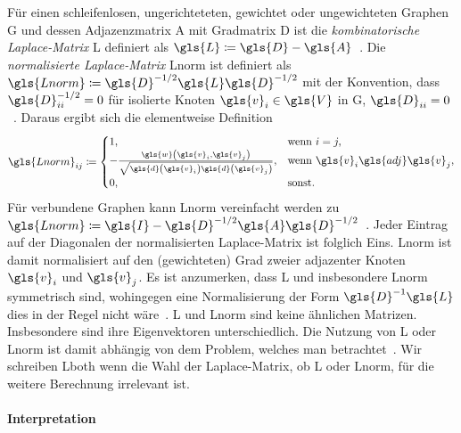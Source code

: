 Für einen schleifenlosen, ungerichteteten, gewichtet oder ungewichteten Graphen \gls{G} und dessen Adjazenzmatrix \gls{A} mit Gradmatrix \gls{D} ist die \emph{kombinatorische Laplace-Matrix} \gls{L} definiert als $\gls{L} \coloneqq \gls{D} - \gls{A}$~\cite{Chung}.
Die \emph{normalisierte Laplace-Matrix} \gls{Lnorm} ist definiert als $\gls{Lnorm} \coloneqq \gls{D}^{-1/2} \gls{L} \gls{D}^{-1/2}$ mit der Konvention, dass $\gls{D}^{-1/2}_{ii} = 0$ für isolierte Knoten $\gls{v}_i \in \gls{V}$ in \gls{G}, \dhe{} $\gls{D}_{ii} = 0$~\cite{Chung}.
Daraus ergibt sich die elementweise Definition
\begin{equation*}
  \gls{Lnorm}_{ij} \coloneqq \begin{cases}
  1, & \text{wenn }i = j,\\
    -\frac{\gls{w}\left(\gls{v}_i, \gls{v}_j\right)}{\sqrt{\gls{d}\left(\gls{v}_i\right)\gls{d}\left(\gls{v}_j\right)}}, & \text{wenn }\gls{v}_i \gls{adj} \gls{v}_j,\\
  0, & \text{sonst.}
\end{cases}
\end{equation*}
Für verbundene Graphen kann \gls{Lnorm} vereinfacht werden zu $\gls{Lnorm} \coloneqq \gls{I} - \gls{D}^{-1/2} \gls{A} \gls{D}^{-1/2}$~\cite{Chung}.
Jeder Eintrag auf der Diagonalen der normalisierten Laplace-Matrix ist folglich Eins.
\gls{Lnorm} ist damit normalisiert auf den (gewichteten) Grad zweier adjazenter Knoten $\gls{v}_i$ und $\gls{v}_j$.
Es ist anzumerken, dass \gls{L} und insbesondere \gls{Lnorm} symmetrisch sind, wohingegen eine Normalisierung der Form $\gls{D}^{-1}\gls{L}$ dies in der Regel nicht wäre~\cite{Reuter}.
\gls{L} und \gls{Lnorm} sind keine ähnlichen Matrizen.
Insbesondere sind ihre Eigenvektoren unterschiedlich.
Die Nutzung von \gls{L} oder \gls{Lnorm} ist damit abhängig von dem Problem, welches man betrachtet~\cite{Hammond}.
Wir schreiben \gls{Lboth} wenn die Wahl der Laplace-Matrix, ob \gls{L} oder \gls{Lnorm}, für die weitere Berechnung irrelevant ist.

\paragraph{Interpretation}
\label{laplace_interpretation}




